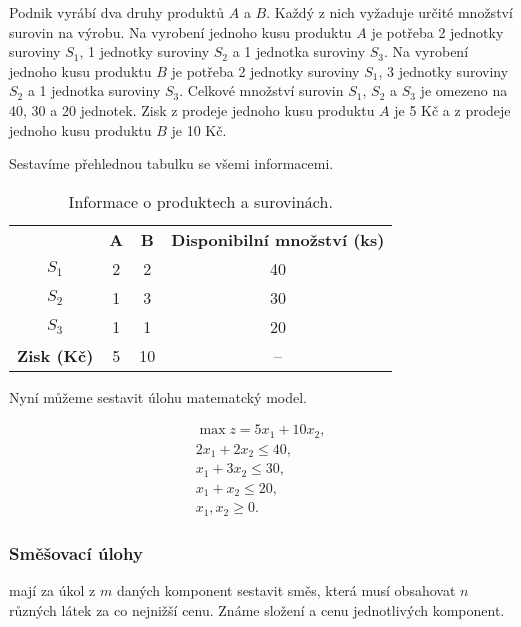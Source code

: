 Podnik vyrábí dva druhy produktů $A$ a $B$. Každý z nich vyžaduje určité množství surovin na výrobu.
Na vyrobení jednoho kusu produktu $A$ je potřeba 2 jednotky suroviny $S_1$, 1 jednotky suroviny $S_2$ a 1 jednotka suroviny $S_3$.
Na vyrobení jednoho kusu produktu $B$ je potřeba 2 jednotky suroviny $S_1$, 3 jednotky suroviny $S_2$ a 1 jednotka suroviny $S_3$.
Celkové množství surovin $S_1$, $S_2$ a $S_3$ je omezeno na 40, 30 a 20 jednotek.
Zisk z prodeje jednoho kusu produktu $A$ je 5 Kč a z prodeje jednoho kusu produktu $B$ je 10 Kč.

Sestavíme přehlednou tabulku se všemi informacemi.

\begin{table}[H]
    \centering
    \begin{tabular}{|c|c|c|c|}
        \hline
        \textbf{} & \textbf{A} & \textbf{B} & \textbf{Disponibilní množství (ks)}\\
        \hhline{|=|=|=|=|}
        $S_1$ & 2 & 2 & 40 \\
        \hline
        $S_2$ & 1 & 3 & 30 \\
        \hline
        $S_3$ & 1 & 1 & 20 \\
        \hhline{|=|=|=|=|}
        \textbf{Zisk (Kč)} & 5 & 10 & -- \\
        \hline
    \end{tabular}
    \caption{Informace o produktech a surovinách.}
    \label{tab:vyroba}
\end{table}

Nyní můžeme sestavit úlohu matematcký model.

\begin{equation}
    \begin{gathered}
        \max z = 5x_1 + 10x_2, \\
        2x_1 + 2x_2 \leq 40, \\
        x_1 + 3x_2 \leq 30, \\
        x_1 + x_2 \leq 20, \\
        x_1, x_2 \geq 0.
    \end{gathered}
\end{equation}

\subsubsection{Směšovací úlohy}
mají za úkol z $m$ daných komponent sestavit směs, která musí obsahovat $n$ různých látek za co nejnižší cenu.
Známe složení a cenu jednotlivých komponent.

